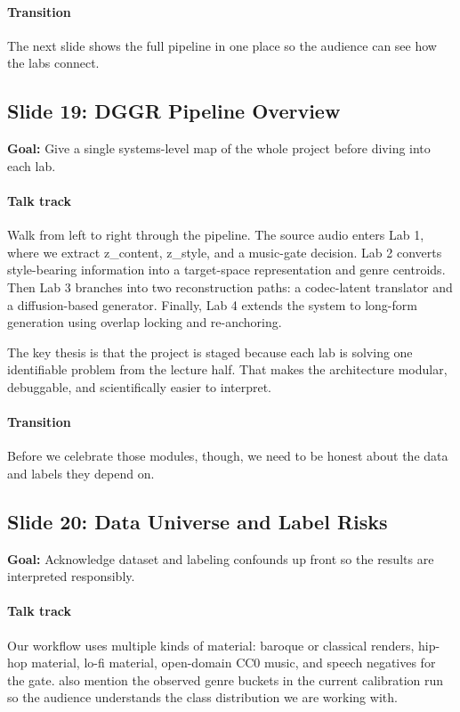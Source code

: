 \documentclass[11pt]{article}
\begin{document}
\paragraph{Transition}
The next slide shows the full pipeline in one place so the audience can see how the labs connect.

\subsection*{Slide 19: DGGR Pipeline Overview}
\textbf{Goal:} Give a single systems-level map of the whole project before diving into each lab.
\paragraph{Talk track}
Walk from left to right through the pipeline. The source audio enters Lab 1, where we extract z\_content, z\_style, and a music-gate decision. Lab 2 converts style-bearing information into a target-space representation and genre centroids. Then Lab 3 branches into two reconstruction paths: a codec-latent translator and a diffusion-based generator. Finally, Lab 4 extends the system to long-form generation using overlap locking and re-anchoring.

The key thesis is that the project is staged because each lab is solving one identifiable problem from the lecture half. That makes the architecture modular, debuggable, and scientifically easier to interpret.

\paragraph{Transition}
Before we celebrate those modules, though, we need to be honest about the data and labels they depend on.

\subsection*{Slide 20: Data Universe and Label Risks}
\textbf{Goal:} Acknowledge dataset and labeling confounds up front so the results are interpreted responsibly.
\paragraph{Talk track}
Our workflow uses multiple kinds of material: baroque or classical renders, hip-hop material, lo-fi material, open-domain CC0 music, and speech negatives for the gate. also mention the observed genre buckets in the current calibration run so the audience understands the class distribution we are working with.
\end{document}
